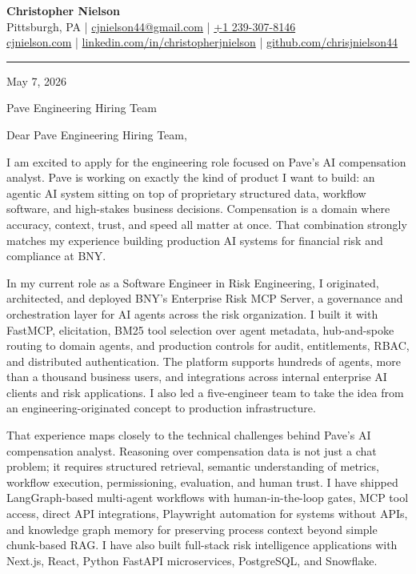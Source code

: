 \documentclass[11pt]{article}
\begin{document}
{\Large \textbf{Christopher Nielson}}\\[4pt]
Pittsburgh, PA \;|\; \href{mailto:cjnielson44@gmail.com}{cjnielson44@gmail.com} \;|\; \href{tel:+12393078146}{+1 239-307-8146}\\
\href{https://cjnielson.com}{cjnielson.com} \;|\;
\href{https://www.linkedin.com/in/christopherjnielson/}{linkedin.com/in/christopherjnielson} \;|\;
\href{https://github.com/chrisjnielson44}{github.com/chrisjnielson44}

\vspace{0.15em}
\hrule
\vspace{0.9em}

May 7, 2026

Pave Engineering Hiring Team

Dear Pave Engineering Hiring Team,

I am excited to apply for the engineering role focused on Pave's AI compensation analyst. Pave is working on exactly the kind of product I want to build: an agentic AI system sitting on top of proprietary structured data, workflow software, and high-stakes business decisions. Compensation is a domain where accuracy, context, trust, and speed all matter at once. That combination strongly matches my experience building production AI systems for financial risk and compliance at BNY.

In my current role as a Software Engineer in Risk Engineering, I originated, architected, and deployed BNY's Enterprise Risk MCP Server, a governance and orchestration layer for AI agents across the risk organization. I built it with FastMCP, elicitation, BM25 tool selection over agent metadata, hub-and-spoke routing to domain agents, and production controls for audit, entitlements, RBAC, and distributed authentication. The platform supports hundreds of agents, more than a thousand business users, and integrations across internal enterprise AI clients and risk applications. I also led a five-engineer team to take the idea from an engineering-originated concept to production infrastructure.

That experience maps closely to the technical challenges behind Pave's AI compensation analyst. Reasoning over compensation data is not just a chat problem; it requires structured retrieval, semantic understanding of metrics, workflow execution, permissioning, evaluation, and human trust. I have shipped LangGraph-based multi-agent workflows with human-in-the-loop gates, MCP tool access, direct API integrations, Playwright automation for systems without APIs, and knowledge graph memory for preserving process context beyond simple chunk-based RAG. I have also built full-stack risk intelligence applications with Next.js, React, Python FastAPI microservices, PostgreSQL, and Snowflake.
\end{document}

